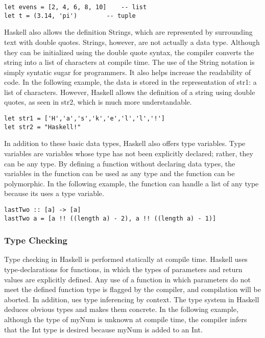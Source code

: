 \documentclass[titlepage,12pt]{article}
\begin{document}
\begin{verbatim}
let evens = [2, 4, 6, 8, 10]	-- list
let t = (3.14, 'pi')		-- tuple
\end{verbatim}

Haskell also allows the definition Strings, which are represented by surrounding text with double quotes. Strings, however, are not actually a data type. Although they can be initialized using the double quote syntax, the compiler converts the string into a list of characters at compile time. The use of the String notation is simply syntatic sugar for programmers. It also helps increase the readability of code. In the following example, the data is stored in the representation of str1: a list of characters. However, Haskell allows the definition of a string using double quotes, as seen in str2, which is much more understandable.

\begin{verbatim}
let str1 = ['H','a','s','k','e','l','l','!']
let str2 = "Haskell!"
\end{verbatim}

In addition to these basic data types, Haskell also offers type variables. Type variables are variables whose type has not been explicitly declared; rather, they can be any type. By defining a function without declaring data types, the variables in the function can be used as any type and the function can be polymorphic. In the following example, the function can handle a list of any type because its uses a type variable. 

\begin{verbatim}
lastTwo :: [a] -> [a]
lastTwo a = [a !! ((length a) - 2), a !! ((length a) - 1)]
\end{verbatim}

\subsubsection{Type Checking}
Type checking in Haskell is performed statically at compile time. Haskell uses type-declarations for functions, in which the types of parameters and return values are explicitly defined. Any use of a function in which parameters do not meet the defined function type is flagged by the compiler, and compilation will be aborted. In addition, ues type inferencing by context. The type system in Haskell deduces obvious types and makes them concrete. In the following example, although the type of myNum is unknown at compile time, the compiler infers that the Int type is desired because myNum is added to an Int. 
\end{document}
